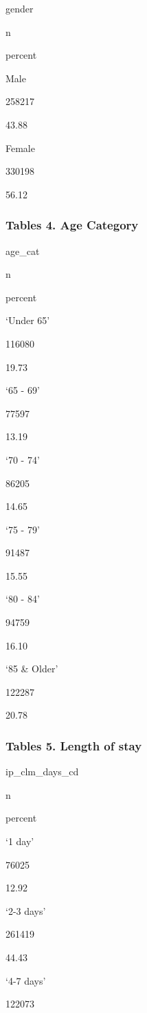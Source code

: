 \documentclass[]{article}
\begin{document}
gender

n

percent

Male

258217

43.88

Female

330198

56.12

\hypertarget{tables-4.-age-category}{%
\subsubsection{Tables 4. Age Category}\label{tables-4.-age-category}}

age\_cat

n

percent

`Under 65'

116080

19.73

`65 - 69'

77597

13.19

`70 - 74'

86205

14.65

`75 - 79'

91487

15.55

`80 - 84'

94759

16.10

`85 \& Older'

122287

20.78

\hypertarget{tables-5.-length-of-stay}{%
\subsubsection{Tables 5. Length of
stay}\label{tables-5.-length-of-stay}}

ip\_clm\_days\_cd

n

percent

`1 day'

76025

12.92

`2-3 days'

261419

44.43

`4-7 days'

122073
\end{document}
